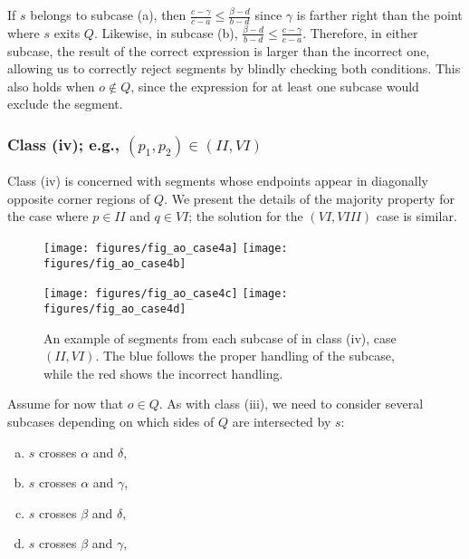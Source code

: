 If $s$ belongs to subcase (a), then $\frac{c - \gamma}{c - a} \leq \frac{\beta - d}{b - d}$ since $\gamma$ is farther right than the point where $s$ exits $Q$. Likewise, in subcase (b), $\frac{\beta - d}{b - d} \leq \frac{c - \gamma}{c - a}$.  Therefore, in either subcase, the result of the correct expression is larger than the incorrect one, allowing us to correctly reject segments by blindly checking both conditions.  This also holds when $o \not \in Q$, since the expression for at least one subcase would exclude the segment.


\subsubsection*{Class (iv); e.g., $(p_1, p_2) \in (II, VI)$}
\label{:rectanges:ao:class4}

Class (iv) is concerned with segments whose endpoints appear in diagonally opposite corner regions of $Q$. We present the details of the majority property for the case where $p \in II$ and $q \in VI$; the solution for the $(VI, VIII)$ case is similar.

\begin{figure}[t]
\begin{center}
  \texttt{[image: figures/fig\_ao\_case4a]}
  \hspace{1.0em}
  \texttt{[image: figures/fig\_ao\_case4b]}

  \vspace{2.0em}
  
  \texttt{[image: figures/fig\_ao\_case4c]}
  \hspace{1.0em}
  \texttt{[image: figures/fig\_ao\_case4d]}

  \caption[An example of a segment in class (iv), case $(II, VI)$.]{An example of segments from each subcase of in class (iv), case $(II, VI)$. The blue follows the proper handling of the subcase, while the red shows the incorrect handling.}
  \label{fig:rectangles:ao:case4}
\end{center}
\end{figure}

Assume for now that $o \in Q$. As with class (iii), we need to consider several subcases depending on which sides of $Q$ are intersected by $s$:

\begin{enumerate}[(a)]
\item $s$ crosses $\alpha$ and $\delta$,
\item $s$ crosses $\alpha$ and $\gamma$,
\item $s$ crosses $\beta$ and $\delta$,
\item $s$ crosses $\beta$ and $\gamma$,
\end{enumerate}

